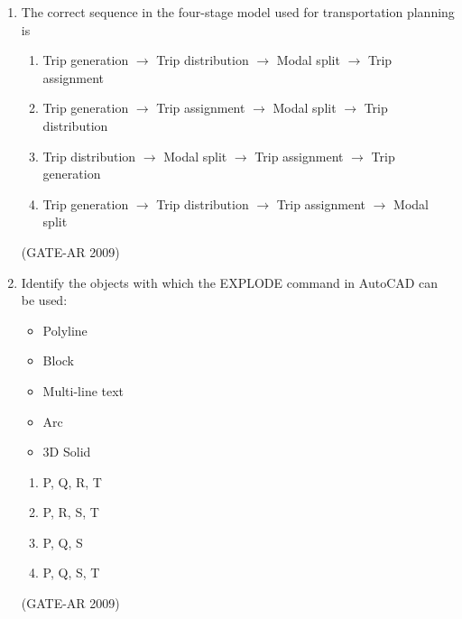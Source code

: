 \documentclass[a4paper,10pt]{article}
\begin{document}
\begin{enumerate}
    \item The correct sequence in the four-stage model used for transportation planning is 
    \begin{enumerate}
        \item Trip generation $\to$ Trip distribution $\to$ Modal split $\to$ Trip assignment
        \item Trip generation $\to$ Trip assignment $\to$ Modal split $\to$ Trip distribution
        \item Trip distribution $\to$ Modal split $\to$ Trip assignment $\to$ Trip generation
        \item Trip generation $\to$ Trip distribution $\to$ Trip assignment $\to$ Modal split
    \end{enumerate}
    \hfill (GATE-AR 2009)

    \item Identify the objects with which the EXPLODE command in AutoCAD can be used: 
    \begin{itemize}
		\item Polyline
		\item Block
		\item Multi-line text
		\item Arc
		\item 3D Solid
	\end{itemize}
	\begin{multicols}{4}
	\begin{enumerate}
        \item P, Q, R, T
        \item P, R, S, T
        \item P, Q, S
        \item P, Q, S, T
    \end{enumerate}
	\end{multicols}
    \hfill (GATE-AR 2009)


\end{enumerate}
\end{document}
